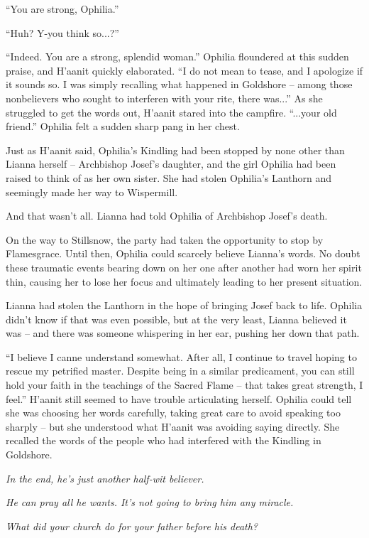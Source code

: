 ``You are strong, Ophilia.''

``Huh? Y-you think so...?''

``Indeed. You are a strong, splendid woman.'' Ophilia floundered at this sudden praise, and H'aanit quickly elaborated. ``I do not mean to tease, and I apologize if it sounds so. I was simply recalling what happened in Goldshore -- among those nonbelievers who sought to interferen with your rite, there was...'' As she struggled to get the words out, H'aanit stared into the campfire. ``...your old friend.'' Ophilia felt a sudden sharp pang in her chest.

Just as H'aanit said, Ophilia's Kindling had been stopped by none other than Lianna herself -- Archbishop Josef's daughter, and the girl Ophilia had been raised to think of as her own sister. She had stolen Ophilia's Lanthorn and seemingly made her way to Wispermill.

And that wasn't all. Lianna had told Ophilia of Archbishop Josef's death.

On the way to Stillsnow, the party had taken the opportunity to stop by Flamesgrace. Until then, Ophilia could scarcely believe Lianna's words. No doubt these traumatic events bearing down on her one after another had worn her spirit thin, causing her to lose her focus and ultimately leading to her present situation.

Lianna had stolen the Lanthorn in the hope of bringing Josef back to life. Ophilia didn't know if that was even possible, but at the very least, Lianna believed it was -- and there was someone whispering in her ear, pushing her down that path.

``I believe I canne understand somewhat. After all, I continue to travel hoping to rescue my petrified master. Despite being in a similar predicament, you can still hold your faith in the teachings of the Sacred Flame -- that takes great strength, I feel.'' H'aanit still seemed to have trouble articulating herself. Ophilia could tell she was choosing her words carefully, taking great care to avoid speaking too sharply -- but she understood what H'aanit was avoiding saying directly. She recalled the words of the people who had interfered with the Kindling in Goldshore.

\emph{In the end, he's just another half-wit believer.}

\emph{He can pray all he wants. It's not going to bring him any miracle.}

\emph{What did your church do for your father before his death?}

